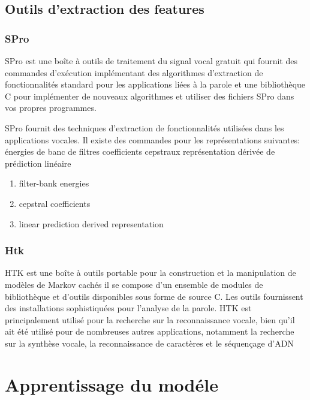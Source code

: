 \documentclass[a4paper, 12pt]{book}
\newcounter{program}[subsection]
\begin{document}
\subsection{Outils d'extraction des features}

\subsubsection{SPro}

SPro est une boîte à outils de traitement du signal vocal gratuit qui fournit des commandes d'exécution implémentant des algorithmes d'extraction de fonctionnalités standard pour les applications liées à la parole et une bibliothèque C pour implémenter de nouveaux algorithmes et utiliser des fichiers SPro dans vos propres programmes.

SPro fournit des techniques d'extraction de fonctionnalités utilisées dans les applications vocales. Il existe des commandes pour les représentations suivantes:
énergies de banc de filtres
coefficients cepstraux
représentation dérivée de prédiction linéaire


\begin{enumerate}
  \item filter-bank energies
  \item cepstral coefficients
  \item linear prediction derived representation
\end{enumerate} 


\subsubsection{Htk}

HTK est une boîte à outils portable pour la construction et la manipulation de modèles de Markov cachés il se compose d'un ensemble de modules de bibliothèque et d'outils disponibles sous forme de source C. Les outils fournissent des installations sophistiquées pour l'analyse de la parole. HTK est principalement utilisé pour la recherche sur la reconnaissance vocale, bien qu'il ait été utilisé pour de nombreuses autres applications, notamment la recherche sur la synthèse vocale, la reconnaissance de caractères et le séquençage d'ADN


\section{Apprentissage du modéle}
\end{document}

